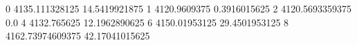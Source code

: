 0 4135.111328125 14.5419921875
1 4120.9609375 0.3916015625
2 4120.5693359375 0.0
4 4132.765625 12.1962890625
6 4150.01953125 29.4501953125
8 4162.73974609375 42.17041015625
